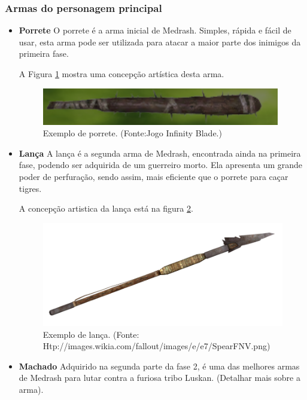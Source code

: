 \subsubsection{Armas do personagem principal}
\begin{itemize}
\item {\bf Porrete}
O porrete é a arma inicial de Medrash. Simples, rápida e fácil de usar,
 esta arma pode ser utilizada para atacar a maior parte dos inimigos da
 primeira fase.

A Figura \ref{img:porrete} mostra uma concepção artística desta arma.

\begin{figure}[H]
 \centering
 \includegraphics[scale=1]{Imagens/porrete01.png}
 \caption{Exemplo de porrete. (Fonte:Jogo Infinity Blade.)}
\label{img:porrete}
\end{figure}

\item {\bf Lança}
A lança é a segunda arma de Medrash, encontrada ainda na primeira fase,
 podendo ser adquirida de um guerreiro morto. Ela apresenta um grande poder
 de perfuração, sendo assim, mais eficiente que o porrete para caçar
 tigres.

A concepção artistica da lança está na figura \ref{img:lanca}.

\begin{figure}[H]
 \centering
 \includegraphics[scale=0.6]{Imagens/lanca01.png}
 \caption{Exemplo de lança. (Fonte: Htp://images.wikia.com/fallout/images/e/e7/SpearFNV.png)}
\label{img:lanca}
\end{figure}


\item {\bf Machado}
Adquirido na segunda parte da fase 2, é uma das melhores armas de Medrash
 para lutar contra a furiosa tribo Luskan. (Detalhar mais sobre a arma).


\end{itemize}
